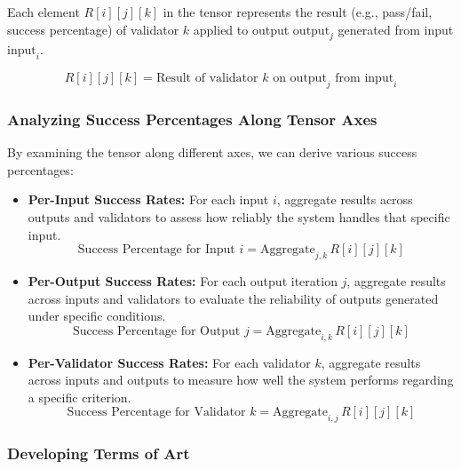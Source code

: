 \documentclass{article}
\begin{document}
Each element \( R[i][j][k] \) in the tensor represents the result (e.g., pass/fail, success percentage) of validator \( k \) applied to output \( \text{output}_j \) generated from input \( \text{input}_i \).

\begin{equation*}
R[i][j][k] = \text{Result of validator } k \text{ on } \text{output}_j \text{ from } \text{input}_i
\end{equation*}

\subsubsection{Analyzing Success Percentages Along Tensor Axes}

By examining the tensor along different axes, we can derive various success percentages:

\begin{itemize}
    \item \textbf{Per-Input Success Rates:} For each input \( i \), aggregate results across outputs and validators to assess how reliably the system handles that specific input.
    \begin{equation*}
    \text{Success Percentage for Input } i = \text{Aggregate}_{j,k} \, R[i][j][k]
    \end{equation*}
    \item \textbf{Per-Output Success Rates:} For each output iteration \( j \), aggregate results across inputs and validators to evaluate the reliability of outputs generated under specific conditions.
    \begin{equation*}
    \text{Success Percentage for Output } j = \text{Aggregate}_{i,k} \, R[i][j][k]
    \end{equation*}
    \item \textbf{Per-Validator Success Rates:} For each validator \( k \), aggregate results across inputs and outputs to measure how well the system performs regarding a specific criterion.
    \begin{equation*}
    \text{Success Percentage for Validator } k = \text{Aggregate}_{i,j} \, R[i][j][k]
    \end{equation*}
\end{itemize}

\subsubsection{Developing Terms of Art}
\end{document}

